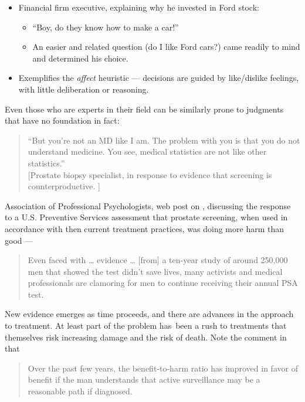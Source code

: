 \documentclass[
  10pt,
  b5paper]{book}
\providecommand{\tightlist}{%
  \setlength{\itemsep}{0pt}\setlength{\parskip}{0pt}}
\begin{document}
\begin{itemize}
\tightlist
\item
  Financial firm executive, explaining why he invested in Ford stock:

  \begin{itemize}
  \tightlist
  \item
    ``Boy, do they know how to make a car!''
  \item
    An easier and related question (do I like Ford cars?) came
    readily to mind and determined his choice.
  \end{itemize}
\item
  Exemplifies the \emph{affect} heuristic --- decisions are guided
  by like/dislike feelings, with little deliberation or reasoning.
\end{itemize}

Even those who are experts in their field can be similarly prone to judgments
that have no foundation in fact:

\begin{quote}
``But you're not an MD like I am. The problem with you is that you
do not understand medicine. You see, medical statistics are not
like other statistics.''\\
{[}Prostate biopsy specialist, in response to evidence that screening
is counterproductive. \citep[p.247]{levitin_2015}{]}
\end{quote}

Association of Professional Psychologists, web post on
\citet{arkes2012psychological}, discussing the response to a
U.S. Preventive Services assessment that prostate screening,
when used in accordance with then current treatment practices,
was doing more harm than good ---

\begin{quote}
Even faced with \ldots{} evidence \ldots{} {[}from{]} a ten-year study of around 250,000 men that showed the test didn't save lives, many activists and medical professionals are clamoring for men to continue receiving their annual PSA test.
\end{quote}

New evidence emerges as time proceeds, and there are advances in the
approach to treatment. At least part of the problem has~been a rush
to treatments that themselves risk increasing damage and the risk of
death. Note the comment in \citet{brawley2018prostate} that

\begin{quote}
Over the past few years, the benefit‐to‐harm ratio has
improved in favor of benefit if the man understands that
active surveillance may be a reasonable path if diagnosed.
\end{quote}
\end{document}

